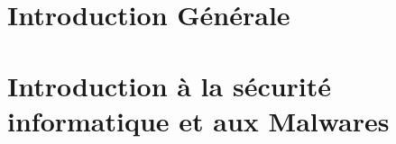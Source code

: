 \documentclass[12pt]{report}
\begin{document}


\renewcommand{\contentsname}{Sommaire}
\tableofcontents
\listoffigures
\listoftables

\chapter*{Introduction Générale}



\chapter{Introduction à la sécurité informatique et aux Malwares}

\end{document}
